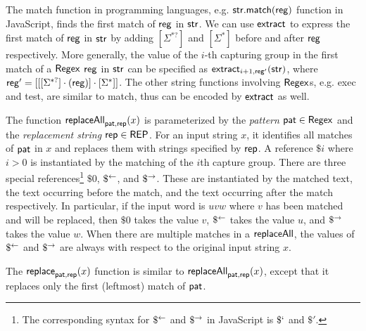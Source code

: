\begin{remark}
The match function in programming languages, e.g. $\sf str.match(reg)$ function in JavaScript, finds the first match of $\sf reg$ in $\sf str$. We can use $\mathsf{extract}$ to express the first match of $\sf reg$ in $\sf str$ by adding $[\Sigma^{*?}]$ and $[\Sigma^*]$ before and after $\sf reg$ respectively. More generally, the value of the $i$-th capturing group in the first match of a ${\sf Regex}$ $\sf reg$ in $\sf str$ can be specified as $\mathsf{extract}_{i+1, {\sf reg'}}({\sf str})$, where ${\sf reg'} = [[[\Sigma^{*?}] \cdot ({\sf reg})] \cdot [\Sigma^*]]$. The other string functions involving ${\sf Regex}$s, e.g. {\sf exec} and {\sf test}, are similar to {\sf match}, thus can be encoded by $\mathsf{extract}$ as well.
\end{remark}

The function $\mathsf{replaceAll}_{\mathsf{pat}, \mathsf{rep}}(x)$ is parameterized by the \emph{pattern} $\mathsf{pat} \in {\sf Regex}$ and the \emph{replacement string} $\mathsf{rep} \in {\sf REP}$.
For an input string $x$, it identifies all matches of $\mathsf{pat}$ in $x$ and replaces them with strings specified by $\mathsf{rep}$.
%
A reference $\$i$ where $i > 0$ is instantiated by the matching of the $i$th capture group.
There are three special references\footnote{
    The corresponding syntax for $\$^{\leftarrow}$ and $\$^{\rightarrow}$ in JavaScript is $\$`$ and $\$'$.
} $\$0$, $\$^{\leftarrow}$, and $\$^{\rightarrow}$.
These are instantiated by the matched text, the text occurring before the match, and the text occurring after the match respectively.
In particular, if the input word is $u v w$ where $v$ has been matched and will be replaced, then $\$0$ takes the value $v$, $\$^{\leftarrow}$ takes the value $u$, and $\$^{\rightarrow}$ takes the value $w$.
When there are multiple matches in a $\mathsf{replaceAll}$, the values of $\$^{\leftarrow}$ and $\$^{\rightarrow}$ are always with respect to the original input string $x$.

The $\mathsf{replace}_{\mathsf{pat}, \mathsf{rep}}(x)$ function is similar to $\mathsf{replaceAll}_{\mathsf{pat}, \mathsf{rep}}(x)$, except that it replaces only the first (leftmost) match of $\mathsf{pat}$.

